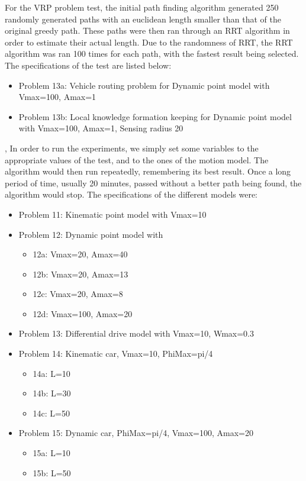 \documentclass[a4paper,12pt]{article}
\begin{document}
For the VRP problem test, the initial path finding algorithm generated 250 randomly generated paths with an euclidean length smaller than that of the original greedy path. These paths were then ran through an RRT algorithm in order to estimate their actual length. Due to the randomness of RRT, the RRT algorithm was ran 100 times for each path, with the fastest result being selected. The specifications of the test are listed below:
\begin{itemize}
\item Problem 13a: Vehicle routing problem for Dynamic point model with Vmax=100, Amax=1
\item Problem 13b: Local knowledge formation keeping for Dynamic point model with Vmax=100, Amax=1, Sensing radius 20
\end{itemize}
, In order to run the experiments, we simply set some variables to the appropriate values of the test, and  to the ones of the motion model. The algorithm would then run repeatedly, remembering its best result. Once a long period of time, usually 20 minutes, passed without a better path being found, the algorithm would stop.
The specifications of the different models were:
\begin{itemize}
\item Problem 11: Kinematic point model with Vmax=10
\item Problem 12: Dynamic point model with 
	\begin{itemize}
	\item 12a: Vmax=20, Amax=40
	\item 12b: Vmax=20, Amax=13
	\item 12c: Vmax=20, Amax=8
	\item 12d: Vmax=100, Amax=20
	\end{itemize}
\item Problem 13: Differential drive model with Vmax=10, Wmax=0.3
\item Problem 14: Kinematic car, Vmax=10, PhiMax=pi/4
	\begin{itemize}
	\item 14a: L=10
	\item 14b: L=30
	\item 14c: L=50
	\end{itemize}
\item Problem 15: Dynamic car, PhiMax=pi/4, Vmax=100, Amax=20
	\begin{itemize}
	\item 15a: L=10
	\item 15b: L=50
	\end{itemize}
\end{itemize}
\end{document}
